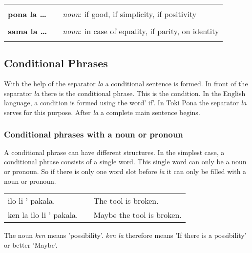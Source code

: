 \begin{supertabular}{p{2,5cm}|ll}
                              &  &                                                                                    \\
    \textbf{pona la \dots}    &  & \textit{noun}: if good, if simplicity, if positivity                               \\
                              &  &                                                                                    \\
    \textbf{sama la \dots}    &  & \textit{noun}: in case of equality, if parity, on identity                         \\
                              &  &                                                                                    \\
\end{supertabular}

\newpage
\subsection*{Conditional Phrases}
With the help of the separator \textit{la} a conditional sentence is formed.
In front of the separator \textit{la} there is the conditional phrase.
This is the condition.
In the English language, a condition is formed using the word' if'.
In Toki Pona the separator \textit{la} serves for this purpose.
After \textit{la} a complete main sentence begins.

\subsubsection*{Conditional phrases with a noun or pronoun}
A conditional phrase can have different structures.
In the simplest case, a conditional phrase consists of a single word.
This single word can only be a noun or pronoun.
So if there is only one word slot before \textit{la} it can only be filled with a noun or pronoun.

\begin{supertabular}{p{5,5cm}|ll}
    ilo li ' pakala.        &  & The tool is broken.       \\
    ken la ilo li ' pakala. &  & Maybe the tool is broken. \\
\end{supertabular}

The noun \textit{ken} means 'possibility'.
\textit{ken la} therefore means 'If there is a possibility' or better 'Maybe'.


